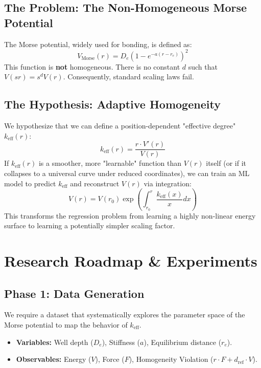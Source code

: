 \documentclass[11pt, a4paper]{article}
\begin{document}
\subsection{The Problem: The Non-Homogeneous Morse Potential}
The Morse potential, widely used for bonding, is defined as:
\begin{equation}
    V_{\text{Morse}}(r) = D_e \left( 1 - e^{-a(r-r_e)} \right)^2
\end{equation}
This function is \textbf{not} homogeneous. There is no constant $d$ such that $V(sr) = s^d V(r)$. Consequently, standard scaling laws fail.

\subsection{The Hypothesis: Adaptive Homogeneity}
We hypothesize that we can define a position-dependent "effective degree" $k_{\text{eff}}(r)$:
\begin{equation}
    k_{\text{eff}}(r) = \frac{r \cdot V'(r)}{V(r)}
\end{equation}
If $k_{\text{eff}}(r)$ is a smoother, more "learnable" function than $V(r)$ itself (or if it collapses to a universal curve under reduced coordinates), we can train an ML model to predict $k_{\text{eff}}$ and reconstruct $V(r)$ via integration:
\begin{equation}
    V(r) = V(r_0) \exp \left( \int_{r_0}^r \frac{k_{\text{eff}}(x)}{x} dx \right)
\end{equation}
This transforms the regression problem from learning a highly non-linear energy surface to learning a potentially simpler scaling factor.

\section{Research Roadmap \& Experiments}

\subsection{Phase 1: Data Generation}
We require a dataset that systematically explores the parameter space of the Morse potential to map the behavior of $k_{\text{eff}}$.
\begin{itemize}
    \item \textbf{Variables:} Well depth ($D_e$), Stiffness ($a$), Equilibrium distance ($r_e$).
    \item \textbf{Observables:} Energy ($V$), Force ($F$), Homogeneity Violation ($r \cdot F + d_{\text{ref}} \cdot V$).
\end{itemize}
\end{document}
